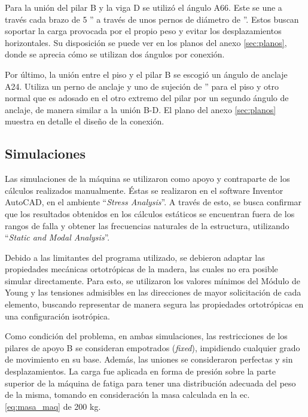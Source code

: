 Para la unión del pilar B y la viga D se utilizó el ángulo A66. Este se une a través cada brazo de 5 '' a través de unos pernos de diámetro de ''. Estos buscan soportar la carga provocada por el propio peso y evitar los desplazamientos horizontales. Su disposición se puede ver en los planos del anexo \ref{sec:planos}, donde se aprecia cómo se utilizan dos ángulos por conexión.

Por último, la unión entre el piso y el pilar B se escogió un ángulo de anclaje A24. Utiliza un perno de anclaje y uno de sujeción de '' para el piso y otro normal que es adosado en el otro extremo del pilar por un segundo ángulo de anclaje, de manera similar a la unión B-D. El plano del anexo \ref{sec:planos} muestra en detalle el diseño de la conexión.
 
\subsection{Simulaciones}
Las simulaciones de la máquina se utilizaron como apoyo y contraparte de los cálculos realizados manualmente. Éstas se realizaron en el software Inventor AutoCAD, en el ambiente ``\textit{Stress Analysis}''. A través de esto, se busca confirmar que los resultados obtenidos en los cálculos estáticos se encuentran fuera de los rangos de falla y obtener las frecuencias naturales de la estructura, utilizando ``\textit{Static and Modal Analysis}''.

Debido a las limitantes del programa utilizado, se debieron adaptar las propiedades mecánicas ortotrópicas de la madera, las cuales no era posible simular directamente. Para esto, se utilizaron los valores mínimos del Módulo de Young y las tensiones admisibles en las direcciones de mayor solicitación de cada elemento, buscando representar de manera segura las propiedades ortotrópicas en una configuración isotrópica.

Como condición del problema, en ambas simulaciones, las restricciones de los pilares de apoyo B se consideran empotrados (\textit{fixed}), impidiendo cualquier grado de movimiento en su base. Además, las uniones se consideraron perfectas y sin desplazamientos. La carga fue aplicada en forma de presión sobre la parte superior de la máquina de fatiga para tener una distribución adecuada del peso de la misma, tomando en consideración la masa calculada en la ec. \ref{eq:masa_maq} de 200 kg.

